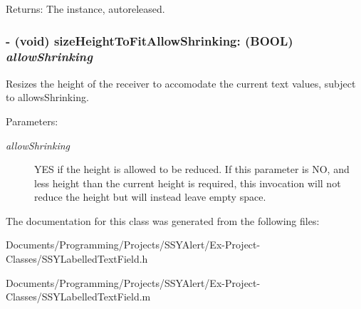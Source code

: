\begin{Desc}
\item[Returns:]The instance, autoreleased. \end{Desc}
\hypertarget{interface_s_s_y_labelled_text_field_87d5c2cae146575b5546c12207e4aa93}{
\subsubsection[{sizeHeightToFitAllowShrinking:}]{\setlength{\rightskip}{0pt plus 5cm}- (void) sizeHeightToFitAllowShrinking: (BOOL) {\em allowShrinking}}}
\label{interface_s_s_y_labelled_text_field_87d5c2cae146575b5546c12207e4aa93}


Resizes the height of the receiver to accomodate the current text values, subject to allowsShrinking. 

\begin{Desc}
\item[Parameters:]
\begin{description}
\item[{\em allowShrinking}]YES if the height is allowed to be reduced. If this parameter is NO, and less height than the current height is required, this invocation will not reduce the height but will instead leave empty space. \end{description}
\end{Desc}


The documentation for this class was generated from the following files:\begin{CompactItemize}
\item 
Documents/Programming/Projects/SSYAlert/Ex-Project-Classes/SSYLabelledTextField.h\item 
Documents/Programming/Projects/SSYAlert/Ex-Project-Classes/SSYLabelledTextField.m\end{CompactItemize}

